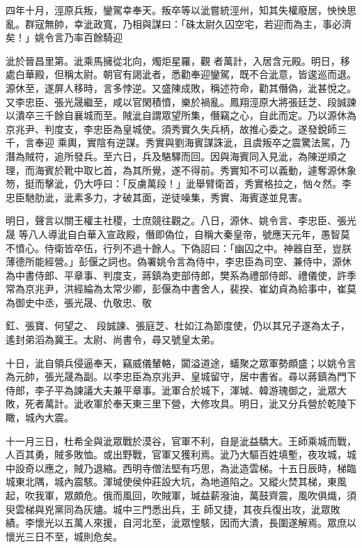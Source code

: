 \begin{pinyinscope}
 四年十月，涇原兵叛，鑾駕幸奉天。叛卒等以泚嘗統涇州，知其失權廢居，怏怏思亂。群寇無帥，幸泚政寬，乃相與謀曰：「硃太尉久囚空宅，若迎而為主，事必濟矣！」姚令言乃率百餘騎迎



 泚於晉昌里第。泚乘馬擁從北向，燭炬星羅，觀
 者萬計，入居含元殿。明日，移處白華殿，但稱太尉。朝官有謁泚者，悉勸奉迎鑾駕，既不合泚意，皆逡巡而退。源休至，遂屏人移時，言多悖逆。又盛陳成敗，稱述符命，勸其僭偽，泚甚悅之。又李忠臣、張光晟繼至，咸以官閑積憤，樂於禍亂。鳳翔涇原大將張廷芝、段誠諫以潰卒三千餘自襄城而至。賊泚自謂眾望所集，僭竊之心，自此而定。乃以源休為京兆尹、判度支，李忠臣為皇城使。須秀實久失兵柄，故推心委之。遂發銳師三千，言奉迎
 乘輿，實陰有逆謀。秀實與劉海賓謀誅泚，且虞叛卒之震驚法駕，乃潛為賊符，追所發兵。至六日，兵及駱驛而回。因與海賓同入見泚，為陳逆順之理，而海賓於靴中取匕首，為其所覺，遂不得前。秀實知不可以義動，遽奪源休象笏，挺而擊泚，仍大呼曰：「反虜萬段！」泚舉臂衛首，秀實格拉之，忷々然。李忠臣馳肋泚，泚素多力，才破其面，逆徒噪集，秀實、海賓遂並見害。



 明日，聲言以關王權主社稷，士庶競往觀之。八日，源休、姚令言、李忠臣、張光晟
 等八人導泚自白華入宣政殿，僭即偽位，自稱大秦皇帝，號應天元年，愚智莫不憤心。侍衛皆卒伍，行列不過十餘人。下偽詔曰：「幽囚之中。神器自至，豈朕薄德所能經營。」彭偃之詞也。偽署姚令言為侍中，李忠臣為司空、兼侍中，源休為中書侍郎、平章事、判度支，蔣鎮為吏部侍郎，樊系為禮部侍郎、禮儀使，許季常為京兆尹，洪經綸為太常少卿，彭偃為中書舍人，裴揆、崔幼貞為給事中，崔莫為御史中丞，張光晟、仇敬忠、敬



 釭、張寶、何望之、
 段誠諫、張庭芝、杜如江為節度使，仍以其兄子遂為太子，遙封弟滔為冀王。太尉、尚書令，尋又號皇太弟。



 十日，泚自領兵侵逼奉天，竊威儀輦輅，闐溢道途，蟻聚之眾軍勢頗盛；以姚令言為元帥，張光晟為副。以李忠臣為京兆尹、皇城留守，居中書省。尋以蔣鎮為門下侍郎，李子平為諫議大夫兼平章事。泚軍合於城下，渾瑊、韓游瑰御之，泚眾大敗，死者萬計。泚收軍於奉天東三里下營，大修攻具。明日，泚又分兵營於乾陵下瞰，城內大震。



 十一月三日，杜希全與泚眾戰於漠谷，官軍不利，自是泚益驕大。王師乘城而戰，人百其勇，賊多敗恤。或出野戰，官軍又獲利焉。泚乃大驅百姓填塹，夜攻城，城中設奇以應之，賊乃退縮。西明寺僧法堅有巧思，為泚造雲梯。十五日辰時，梯臨城東北隅，城內震駭。渾瑊使侯仲莊設大坑，為地道陷之。又縱火焚其梯，東風起，吹我軍，眾頗危。俄而風回，吹賊軍，瑊益薪潑油，萬鼓齊震，風吹俱熾，須臾雲梯與兇黨同為灰燼。城中三門悉出兵，王
 師又捷，其夜兵復出攻，泚眾敗績。李懷光以五萬人來援，自河北至，泚眾惶駭，因而大潰，長圍遂解焉。眾庶以懷光三日不至，城則危矣。




\end{pinyinscope}
